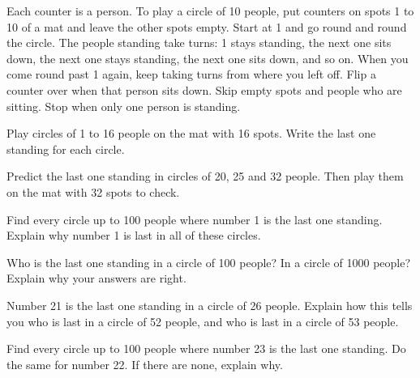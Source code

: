 \documentclass[12pt]{article}
\begin{document}
Each counter is a person. To play a circle of 10 people, put counters on spots 1 to 10 of a mat and leave the other spots empty. Start at 1 and go round and round the circle. The people standing take turns: 1 stays standing, the next one sits down, the next one stays standing, the next one sits down, and so on. When you come round past 1 again, keep taking turns from where you left off. Flip a counter over when that person sits down. Skip empty spots and people who are sitting. Stop when only one person is standing.

 Play circles of 1 to 16 people on the mat with 16 spots. Write the last one standing for each circle.

\noindent{}

\vspace{0.3cm}
\noindent{}

\vspace{0.4cm}
 Predict the last one standing in circles of 20, 25 and 32 people. Then play them on the mat with 32 spots to check.

\noindent{}

\vspace{0.4cm}
 Find every circle up to 100 people where number 1 is the last one standing. Explain why number 1 is last in all of these circles.

\noindent{}

\newpage
{} Who is the last one standing in a circle of 100 people? In a circle of 1000 people? Explain why your answers are right.

\noindent{}

\vspace{0.5cm}
 Number 21 is the last one standing in a circle of 26 people. Explain how this tells you who is last in a circle of 52 people, and who is last in a circle of 53 people.

\noindent{}

\newpage
{} Find every circle up to 100 people where number 23 is the last one standing. Do the same for number 22. If there are none, explain why.
\end{document}
